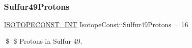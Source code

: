\subsubsection{\texorpdfstring{Sulfur49\+Protons}{Sulfur49Protons}}
{\footnotesize\ttfamily \mbox{\hyperlink{group___isotope_const-_macros_ga5f18360b3e99483a35c32d789e62621c}{I\+S\+O\+T\+O\+P\+E\+C\+O\+N\+S\+T\+\_\+\+I\+NT}} Isotope\+Const\+::\+Sulfur49\+Protons = 16}

\$ \$ Protons in Sulfur-\/49. 